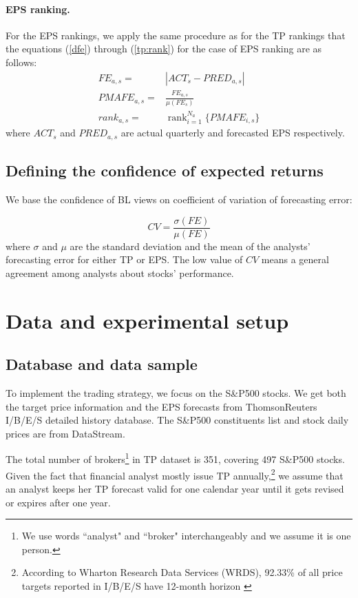 \documentclass{article}\usepackage[]{graphicx}\usepackage[]{color}
\DeclareMathOperator{\rank}{rank}
\begin{document}
\paragraph{EPS ranking.} For the EPS rankings, we apply the same procedure as for the TP rankings that the equations (\ref{dfe}) through (\ref{tp:rank}) for the case of EPS ranking are as follows:
\begin{eqnarray}
\label{eps:rank}
FE_{a,s}=&|{ACT_{s}-PRED_{a,s}}| \nonumber \\
PMAFE_{a,s}=& \frac{FE_{a,s}}{\mu(FE_{s})} \nonumber \\
rank_{a,s}=&\rank_{i=1}^{N_a} \{ PMAFE_{i,s} \}  \nonumber
\end{eqnarray}
where $ACT_{s}$ and $PRED_{a,s}$ are actual quarterly and forecasted EPS respectively.


\subsection{Defining the confidence of expected returns}
\label{def-omega}
We base the confidence of BL views on coefficient of variation of forecasting error:

\begin{equation}
CV = \frac{\sigma (FE)}{\mu (FE)}
\end{equation}
where $\sigma$ and $\mu$ are the standard deviation and the mean of the analysts' forecasting error for either TP or EPS. The low value of $CV$ means a general agreement among analysts about stocks' performance.

\section{Data and experimental setup}
\label{sec:rankings}

\subsection{Database and data sample}
To implement the trading strategy, we focus on the  S\&P500 stocks. We get both the target price information and the EPS forecasts from ThomsonReuters  I/B/E/S detailed history database. The  S\&P500 constituents list and stock daily prices are from DataStream.


The total number of brokers\footnote{We use words ``analyst" and ``broker" interchangeably  and we assume it is  one person.} in TP dataset is 351, covering 497 S\&P500 stocks. Given the fact that financial analyst mostly issue TP annually,\footnote{According to Wharton Research Data Services (WRDS), 92.33\% of all price targets reported in I/B/E/S have 12-month horizon \citep{glushkov2009}} we assume that an analyst keeps her TP forecast valid for one calendar year until it gets revised or expires after one year.
\end{document}
